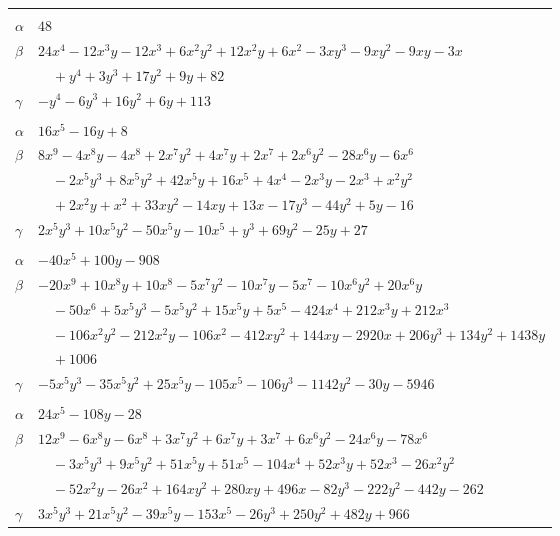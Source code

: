 \documentclass[11pt]{article}
\begin{document}
\begin{longtable}{@{}ll@{}}
\addlinespace[3pt]
\multicolumn{2}{@{}l}{$\{i,j\}=\{11,16\}$, $k_{ij}=2^{6}\cdot 3$}\\
$\alpha$ & $48$\\
$\beta$ & $24x^{4}-12x^{3}y-12x^{3}+6x^{2}y^{2}+12x^{2}y+6x^{2}-3xy^{3}-9xy^{2}-9xy-3x$\\
 & $\quad +y^{4}+3y^{3}+17y^{2}+9y+82$\\
$\gamma$ & $-y^{4}-6y^{3}+16y^{2}+6y+113$\\
\addlinespace[3pt]
\multicolumn{2}{@{}l}{$\{i,j\}=\{11,24\}$, $k_{ij}=2^{3}\cdot 3$}\\
$\alpha$ & $16x^{5}-16y+8$\\
$\beta$ & $8x^{9}-4x^{8}y-4x^{8}+2x^{7}y^{2}+4x^{7}y+2x^{7}+2x^{6}y^{2}-28x^{6}y-6x^{6}$\\
 & $\quad -2x^{5}y^{3}+8x^{5}y^{2}+42x^{5}y+16x^{5}+4x^{4}-2x^{3}y-2x^{3}+x^{2}y^{2}$\\
 & $\quad +2x^{2}y+x^{2}+33xy^{2}-14xy+13x-17y^{3}-44y^{2}+5y-16$\\
$\gamma$ & $2x^{5}y^{3}+10x^{5}y^{2}-50x^{5}y-10x^{5}+y^{3}+69y^{2}-25y+27$\\
\addlinespace[3pt]
\multicolumn{2}{@{}l}{$\{i,j\}=\{11,25\}$, $k_{ij}=2^{6}\cdot 3^{2}\cdot 7$}\\
$\alpha$ & $-40x^{5}+100y-908$\\
$\beta$ & $-20x^{9}+10x^{8}y+10x^{8}-5x^{7}y^{2}-10x^{7}y-5x^{7}-10x^{6}y^{2}+20x^{6}y$\\
 & $\quad -50x^{6}+5x^{5}y^{3}-5x^{5}y^{2}+15x^{5}y+5x^{5}-424x^{4}+212x^{3}y+212x^{3}$\\
 & $\quad -106x^{2}y^{2}-212x^{2}y-106x^{2}-412xy^{2}+144xy-2920x+206y^{3}+134y^{2}+1438y$\\
 & $\quad +1006$\\
$\gamma$ & $-5x^{5}y^{3}-35x^{5}y^{2}+25x^{5}y-105x^{5}-106y^{3}-1142y^{2}-30y-5946$\\
\addlinespace[3pt]
\multicolumn{2}{@{}l}{$\{i,j\}=\{11,26\}$, $k_{ij}=2^{4}\cdot 3\cdot 5^{2}$}\\
$\alpha$ & $24x^{5}-108y-28$\\
$\beta$ & $12x^{9}-6x^{8}y-6x^{8}+3x^{7}y^{2}+6x^{7}y+3x^{7}+6x^{6}y^{2}-24x^{6}y-78x^{6}$\\
 & $\quad -3x^{5}y^{3}+9x^{5}y^{2}+51x^{5}y+51x^{5}-104x^{4}+52x^{3}y+52x^{3}-26x^{2}y^{2}$\\
 & $\quad -52x^{2}y-26x^{2}+164xy^{2}+280xy+496x-82y^{3}-222y^{2}-442y-262$\\
$\gamma$ & $3x^{5}y^{3}+21x^{5}y^{2}-39x^{5}y-153x^{5}-26y^{3}+250y^{2}+482y+966$\\

\end{longtable}
\end{document}
